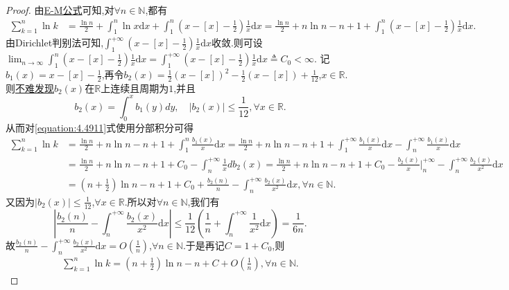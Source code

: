 \documentclass[../../main.tex]{subfiles}
\begin{document}
\begin{proof}
由\hyperref[proposition:0阶欧拉麦克劳林公式(0阶E-M公式)]{E-M公式}可知,对\(\forall n\in\mathbb{N}\),都有
\begin{align}\label{equation:4.4911}
\sum_{k = 1}^n\ln k&=\frac{\ln n}{2}+\int_1^n\ln x\mathrm{d}x+\int_1^n\left(x - [x] - \frac{1}{2}\right)\frac{1}{x}\mathrm{d}x
=\frac{\ln n}{2}+n\ln n - n + 1+\int_1^n\left(x - [x] - \frac{1}{2}\right)\frac{1}{x}\mathrm{d}x.
\end{align}
由Dirichlet判别法可知,\(\int_1^{+\infty}\left(x - [x] - \frac{1}{2}\right)\frac{1}{x}\mathrm{d}x\)收敛.则可设\(\lim_{n\rightarrow\infty}\int_1^n\left(x - [x] - \frac{1}{2}\right)\frac{1}{x}\mathrm{d}x=\int_1^{+\infty}\left(x - [x] - \frac{1}{2}\right)\frac{1}{x}\mathrm{d}x\triangleq C_0<\infty\).
记\(b_1(x)=x - [x] - \frac{1}{2}\),再令\(b_2(x)=\frac{1}{2}(x - [x])^2 - \frac{1}{2}(x - [x]) + \frac{1}{12}\),\(x\in\mathbb{R}\).则\hyperlink{b2性质}{不难发现}\(b_2(x)\)在\(\mathbb{R}\)上连续且周期为\(1\),并且
\[
b_2(x)=\int_0^x{b_1(y)dy}, \quad |b_2(x)|\leqslant\frac{1}{12}, \forall x\in\mathbb{R}.
\]
从而对\eqref{equation:4.4911}式使用分部积分可得
\begin{align*}
\sum_{k=1}^n{\ln k}&=\frac{\ln n}{2}+n\ln n-n+1+\int_1^n{\frac{b_1\left( x \right)}{x}\mathrm{d}x}=\frac{\ln n}{2}+n\ln n-n+1+\int_1^{+\infty}{\frac{b_1\left( x \right)}{x}\mathrm{d}x}-\int_n^{+\infty}{\frac{b_1\left( x \right)}{x}\mathrm{d}x}
\\
&=\frac{\ln n}{2}+n\ln n-n+1+C_0-\int_n^{+\infty}{\frac{1}{x}db_2\left( x \right)}=\frac{\ln n}{2}+n\ln n-n+1+C_0-\frac{b_2\left( x \right)}{x}\Big|_{n}^{+\infty}-\int_n^{+\infty}{\frac{b_2\left( x \right)}{x^2}\mathrm{d}x}
\\
&=\left( n+\frac{1}{2} \right) \ln n-n+1+C_0+\frac{b_2\left( n \right)}{n}-\int_n^{+\infty}{\frac{b_2\left( x \right)}{x^2}\mathrm{d}x},\forall n\in\mathbb{N}.
\end{align*}
又因为\(|b_2(x)|\leqslant\frac{1}{12}\),\(\forall x\in\mathbb{R}\).所以对\(\forall n\in\mathbb{N}\),我们有
\[
\left|\frac{b_2(n)}{n} - \int_n^{+\infty}\frac{b_2(x)}{x^2}\mathrm{d}x\right|\leqslant\frac{1}{12}\left(\frac{1}{n}+\int_n^{+\infty}\frac{1}{x^2}\mathrm{d}x\right)=\frac{1}{6n}.
\]
故\(\frac{b_2(n)}{n} - \int_n^{+\infty}\frac{b_2(x)}{x^2}\mathrm{d}x = O\left(\frac{1}{n}\right)\),\(\forall n\in\mathbb{N}\).于是再记\(C = 1 + C_0\),则
\begin{align}\label{equation:4491}
\sum_{k = 1}^n\ln k=\left(n + \frac{1}{2}\right)\ln n - n + C + O\left(\frac{1}{n}\right),\forall n\in\mathbb{N} .

\end{align}
\end{proof}
\end{document}
